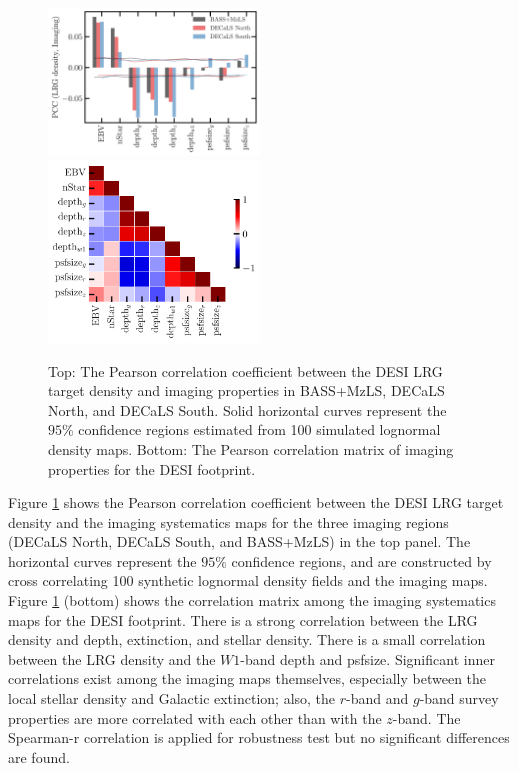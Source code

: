 \begin{figure}
 \includegraphics[width=0.5\textwidth]{figures/pcc.pdf} 
 \includegraphics[width=0.5\textwidth]{figures/pccx.pdf}  
 \caption{Top: The Pearson correlation coefficient between the DESI LRG target density and imaging properties in BASS+MzLS, DECaLS North, and DECaLS South. Solid horizontal curves represent the $95\%$ confidence regions estimated from 100 simulated lognormal density maps. Bottom: The Pearson correlation matrix of imaging properties for the DESI footprint.}
 \label{fig:pcc}
\end{figure}

Figure \ref{fig:pcc} shows the Pearson correlation coefficient between the DESI LRG target density and the imaging systematics maps for the three imaging regions (DECaLS North, DECaLS South, and BASS+MzLS) in the top panel. The horizontal curves represent the $95\%$ confidence regions, and are constructed by cross correlating 100 synthetic lognormal density fields and the imaging maps. Figure \ref{fig:pcc} (bottom) shows the correlation matrix among the imaging systematics maps for the DESI footprint. There is a strong correlation between the LRG density and depth, extinction, and stellar density. There is a small correlation between the LRG density and the $W1$-band depth and psfsize. Significant inner correlations exist among the imaging maps themselves, especially between the local stellar density and Galactic extinction; also, the $r$-band and $g$-band survey properties are more correlated with each other than with the $z$-band. The Spearman-r correlation is applied for robustness test but no significant differences are found.

